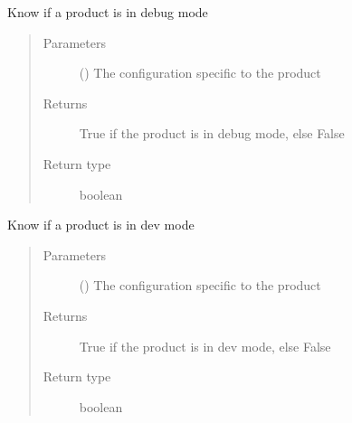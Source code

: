\documentclass[a4paper,10pt,english]{sphinxmanual}
\begin{document}

\begin{fulllineitems}
\label{\detokenize{commands/apidoc/src:src.product.product_is_debug}}
Know if a product is in debug mode
\begin{quote}\begin{description}
\item[{Parameters}] \leavevmode
{} () \textendash{} The configuration specific to 
the product

\item[{Returns}] \leavevmode
True if the product is in debug mode, else False

\item[{Return type}] \leavevmode
boolean

\end{description}\end{quote}

\end{fulllineitems}


\begin{fulllineitems}
\label{\detokenize{commands/apidoc/src:src.product.product_is_dev}}
Know if a product is in dev mode
\begin{quote}\begin{description}
\item[{Parameters}] \leavevmode
{} () \textendash{} The configuration specific to 
the product

\item[{Returns}] \leavevmode
True if the product is in dev mode, else False

\item[{Return type}] \leavevmode
boolean

\end{description}\end{quote}

\end{fulllineitems}
\end{document}

